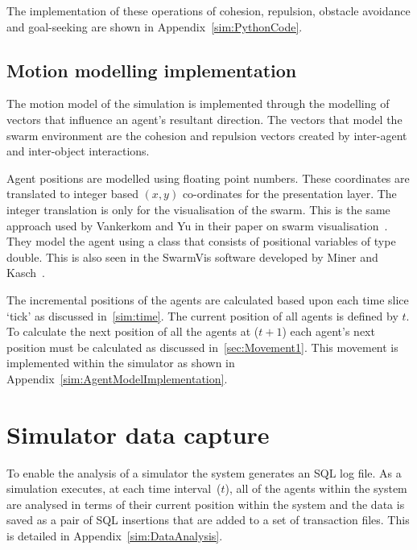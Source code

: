 The implementation of these operations of cohesion, repulsion, obstacle avoidance and goal-seeking are shown in Appendix~\ref{sim:PythonCode}.

\subsection{Motion modelling implementation}
The motion model of the simulation is implemented through the modelling of vectors that influence an agent's resultant direction. The vectors that model the swarm environment are the cohesion and repulsion vectors created by inter-agent and inter-object interactions. 

Agent positions are modelled using floating point numbers. These coordinates are translated to integer based $(x,y)$ co-ordinates for the presentation layer. The integer translation is only for the visualisation of the swarm. This is the same approach used by Vankerkom and Yu in their paper on swarm visualisation~\cite{VY:04}. They model the agent using a class that consists of positional variables of type double. This is also seen in the SwarmVis software developed by Miner and Kasch~\cite{DMNK:ND}.

The incremental positions of the agents are calculated based upon each time slice `tick' as discussed in~\autoref{sim:time}. The current position of all agents is defined by $t$. To calculate the next position of all the agents at ($t+1$) each agent's next position must be calculated as discussed in~\autoref{sec:Movement1}. This movement is implemented within the simulator as shown in Appendix~\ref{sim:AgentModelImplementation}.

\section{Simulator data capture}
To enable the analysis of a simulator the system generates an SQL log file. As a simulation executes, at each time interval~($t$), all of the agents within the system are analysed in terms of their current position within the system and the data is saved as a pair of SQL insertions that are added to a set of transaction files. This is detailed in Appendix~\ref{sim:DataAnalysis}.


